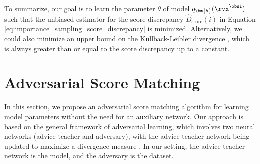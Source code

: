 To summarize, our goal is to learn the parameter $\theta$ of model $q_{\bm{\theta}}(\rvx^{\obsi})$ such that the unbiased estimator for the score discrepancy $\widehat{D}_{\text{score}}(i)$ in Equation \eqref{eq:importance_sampling_score_discrepancy} is minimized. Alternatively, we could also minimize an upper bound on the Kullback-Leibler divergence \citep{Gutmann2010, Song2019}, which is always greater than or equal to the score discrepancy up to a constant.


\section{Adversarial Score Matching}

\label{sec:asm}
In this section, we propose an adversarial score matching algorithm for learning model parameters without the need for an auxiliary network. Our approach is based on the general framework of adversarial learning, which involves two neural networks (advice-teacher and adversary), with the advice-teacher network being updated to maximize a divergence measure \citep{Huszar2017}. In our setting, the advice-teacher network is the model, and the adversary is the dataset.
